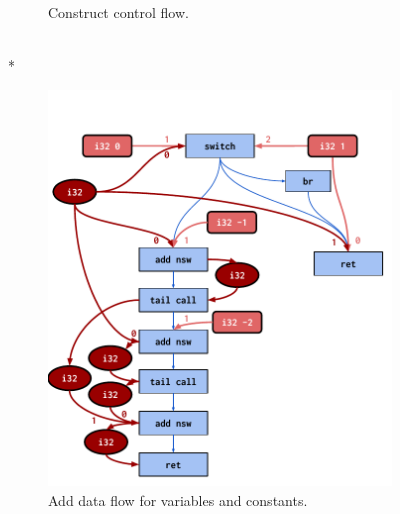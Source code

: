 \begin{figure}
\begin{subfigure}{.48\linewidth}
    \caption{Construct control flow.}
    \label{subfigure:control_flow}%
  \end{subfigure}
  \\*
  \vspace{1em}
  \begin{subfigure}{.48\linewidth}%
    \includegraphics[width=\linewidth]{images/C_Data}%
    \caption{Add data flow for variables and constants.}
    \label{subfigure:data_flow}%
  \end{subfigure}
  \begin{subfigure}{.48\linewidth}%

\end{subfigure}
\end{figure}
